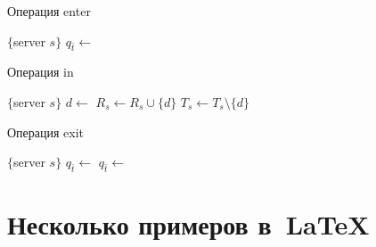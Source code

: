 \begin{algorithm}[H]
	\caption{Операция enter}\label{alg6}
	\begin{algorithmic}[1]
		\Statex $\{$server $s \}$
		\State $q_{\bar t} \gets $ 
		\State {}
		\EndIf
		\EndUpon
	\end{algorithmic}
\end{algorithm}
\begin{algorithm}[H]
	\caption{Операция in}\label{alg7}
	\begin{algorithmic}[1]
		\Statex $\{$server $s \}$
		\State $d \gets $ 
		\State $R_s \gets R_s \cup \{d\}$
		\EndIf
		\State $T_s \gets T_s \setminus \{d\}$
		\EndIf
		\State {}
		\EndUpon
	\end{algorithmic}
\end{algorithm}
\begin{algorithm}[H]
	\caption{Операция exit}\label{alg8}
	\begin{algorithmic}[1]
		\Statex $\{$server $s \}$
		\State $q_{\bar t} \gets $ 
		\State $q_{\bar t} \gets $ 
		\State {}
		\EndIf
		\EndIf
		\EndUpon
	\end{algorithmic}
\end{algorithm}
\fi

\section{Несколько примеров в~\LaTeX{}}
\label{sec:examples}

